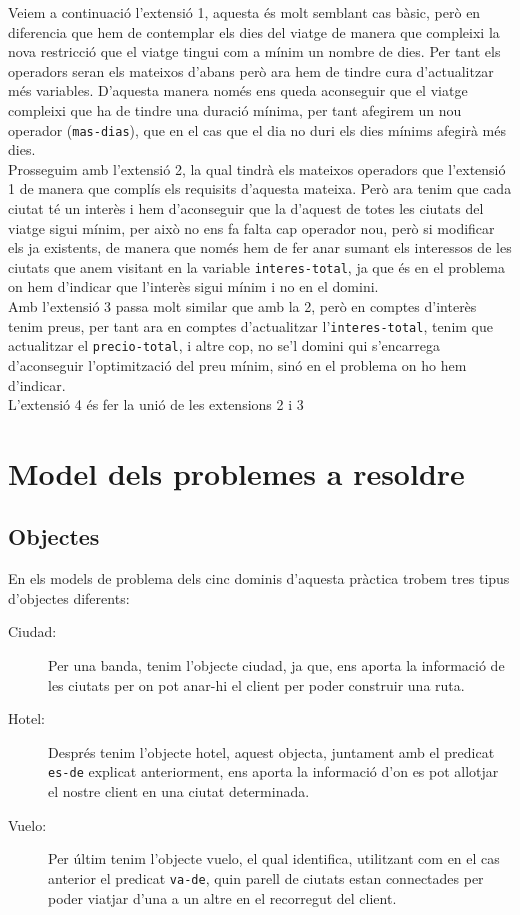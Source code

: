 \documentclass[11pt,a4paper]{article}
\begin{document}
Veiem a continuació l'extensió 1, aquesta és molt semblant cas bàsic, però en diferencia que hem de contemplar els dies del viatge de manera que compleixi la nova restricció que el viatge tingui com a mínim un nombre de dies. Per tant els operadors seran els mateixos d'abans però ara hem de tindre cura d'actualitzar més variables. D'aquesta manera només ens queda aconseguir que el viatge compleixi que ha de tindre una duració mínima, per tant afegirem un nou operador (\texttt{mas-dias}), que en el cas que el dia no duri els dies mínims afegirà més dies.\\

Prosseguim amb l'extensió 2, la qual tindrà els mateixos operadors que l'extensió 1 de manera que complís els requisits d'aquesta mateixa. Però ara tenim que cada ciutat té un interès i hem d'aconseguir que la d'aquest de totes les ciutats del viatge sigui mínim, per això no ens fa falta cap operador nou, però si modificar els ja existents, de manera que només hem de fer anar sumant els interessos de les ciutats que anem visitant en la variable \texttt{interes-total}, ja que és en el problema on hem d'indicar que l'interès sigui mínim i no en el domini.\\

Amb l'extensió 3 passa molt similar que amb la 2, però en comptes d'interès tenim preus, per tant ara en comptes d'actualitzar l'\texttt{interes-total}, tenim que actualitzar el \texttt{precio-total}, i altre cop, no se'l domini qui s'encarrega d'aconseguir l'optimització del preu mínim, sinó en el problema on ho hem d'indicar.\\

L'extensió 4 és fer la unió de les extensions 2 i 3

\section{Model dels problemes a resoldre}
\subsection{Objectes}
En els models de problema dels cinc dominis d'aquesta pràctica trobem tres tipus d'objectes diferents:

\begin{description}
\item[Ciudad:] Per una banda, tenim l'objecte ciudad, ja que, ens aporta la informació de les ciutats per on pot anar-hi el client per poder construir una ruta.
\item[Hotel:] Després tenim l'objecte hotel, aquest objecta, juntament amb el predicat \texttt{es-de} explicat anteriorment, ens aporta la informació d'on es pot allotjar el nostre client en una ciutat determinada.
\item[Vuelo:] Per últim tenim l'objecte vuelo, el qual identifica, utilitzant com en el cas anterior el predicat \texttt{va-de}, quin parell de ciutats estan connectades per poder viatjar d'una a un altre en el recorregut del client.
\end{description}
\end{document}
